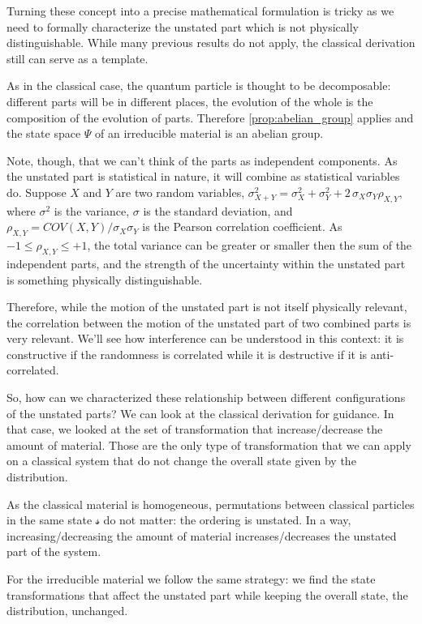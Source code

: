 \documentclass[aps,pra,10pt,twocolumn,floatfix,nofootinbib]{revtex4-1}
\numberwithin{equation}{section}
\theoremstyle{definition}
\begin{document}
Turning these concept into a precise mathematical formulation is tricky as we need to formally characterize the unstated part which is not physically distinguishable. While many previous results do not apply, the classical derivation still can serve as a template.

As in the classical case, the quantum particle is thought to be decomposable: different parts will be in different places, the evolution of the whole is the composition of the evolution of parts. Therefore \ref{prop:abelian_group} applies and the state space $\Psi$ of an irreducible material is an abelian group.

Note, though, that we can't think of the parts as independent components. As the unstated part is statistical in nature, it will combine as statistical variables do. Suppose $X$ and $Y$ are two random variables, $\sigma^2_{X+Y} = \sigma^2_{X} + \sigma^2_{Y} + 2 \, \sigma_{X} \sigma_{Y} \rho_{X,Y}$, where $\sigma^2$ is the variance, $\sigma$ is the standard deviation, and $\rho_{X,Y}=COV(X,Y)/\sigma_{X} \sigma_{Y}$ is the Pearson correlation coefficient. As $-1\leq\rho_{X,Y}\leq+1$, the total variance can be greater or smaller then the sum of the independent parts, and the strength of the uncertainty within the unstated part is something physically distinguishable.

Therefore, while the motion of the unstated part is not itself physically relevant, the correlation between the motion of the unstated part of two combined parts is very relevant. We'll see how interference can be understood in this context: it is constructive if the randomness is correlated while it is destructive if it is anti-correlated.

So, how can we characterized these relationship between different configurations of the unstated parts? We can look at the classical derivation for guidance. In that case, we looked at the set of transformation that increase/decrease the amount of material. Those are the only type of transformation that we can apply on a classical system that do not change the overall state given by the distribution.

As the classical material is homogeneous, permutations between classical particles in the same state $\mathcal{s}$ do not matter: the ordering is unstated. In a way, increasing/decreasing the amount of material increases/decreases the unstated part of the system.

For the irreducible material we follow the same strategy: we find the state transformations that affect the unstated part while keeping the overall state, the distribution, unchanged.
\end{document}
